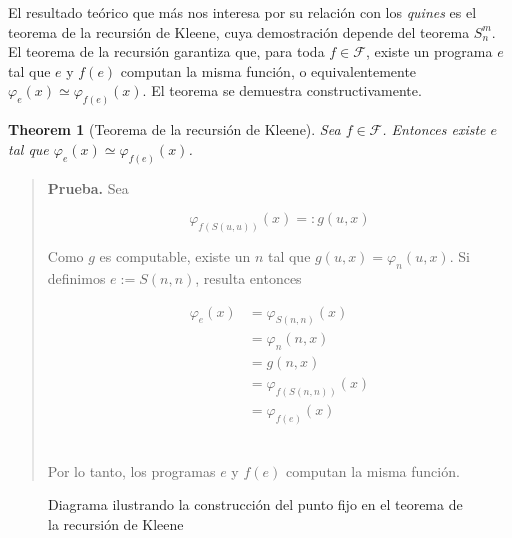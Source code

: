 \documentclass[a4paper, 12pt]{article}
\newtheorem{theorem}{Theorem}
\newtheorem{theorem}{Theorem}
\begin{document}
El resultado teórico que más nos interesa por su relación con los \textit{quines}
es el teorema de la recursión de Kleene, cuya demostración depende del teorema
$S_n^m$. El teorema de la recursión garantiza que, para toda
$f \in \mathcal{F}$, existe un programa $e$ tal que $e$ y $f(e)$ computan la
misma función, o equivalentemente $\varphi_e(x) \simeq \varphi_{f(e)}(x)$. El
teorema se demuestra constructivamente. 

\begin{theorem}[Teorema de la recursión de Kleene]
  Sea $f \in \mathcal{F}$. Entonces existe $e$ tal que $\varphi_e(x) \simeq
  \varphi_{f(e)}(x)$.
\end{theorem}


\small
\begin{quote}

\textbf{Prueba.} Sea 

$$\varphi_{f(S(u, u))}(x) =: g(u, x)$$ 


Como $g$ es computable, existe un $n$ tal que $g(u, x) = \varphi_n(u, x)$. Si
definimos $e := S(n, n)$, resulta entonces

\begin{align*}
  \varphi_e(x) 
  &=\varphi_{S(n, n)}(x) \\ 
  &=\varphi_n(n, x) \\ 
  &=g(n, x) \\ 
  &=\varphi_{f(S(n, n))}(x) \\ 
  &=\varphi_{f(e)}(x)
\end{align*}
~

Por lo tanto, los programas $e$ y $f(e)$ computan la misma función. 

\end{quote}
\normalsize


\begin{figure}[ht]
  \centering
  \caption{Diagrama ilustrando la construcción del punto fijo en el teorema de
  la recursión de Kleene}
  \label{fig:kleene-recursion}
\end{figure}
\end{document}
